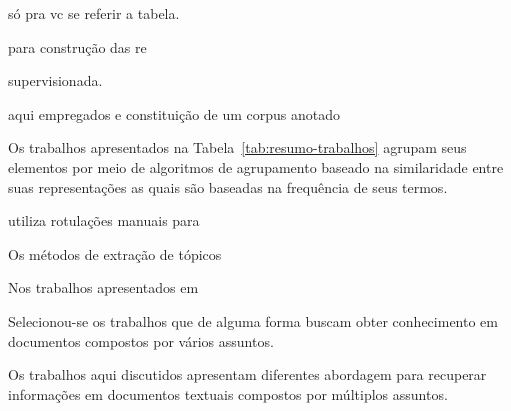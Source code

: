 só pra vc se referir a tabela. 



















para construção das re


supervisionada.

aqui empregados e constituição de um corpus anotado 





Os trabalhos apresentados na Tabela~\ref{tab:resumo-trabalhos} agrupam seus elementos por meio de algoritmos de agrupamento baseado na similaridade entre suas representações as quais são baseadas na frequência de seus termos.




 utiliza rotulações manuais para 	


Os métodos de extração de tópicos 

Nos trabalhos apresentados em~\cite{} 







































Selecionou-se os trabalhos que de alguma forma buscam obter conhecimento em documentos compostos por vários assuntos.  

Os trabalhos aqui discutidos apresentam diferentes abordagem para recuperar informações em   documentos textuais compostos por múltiplos assuntos.  

